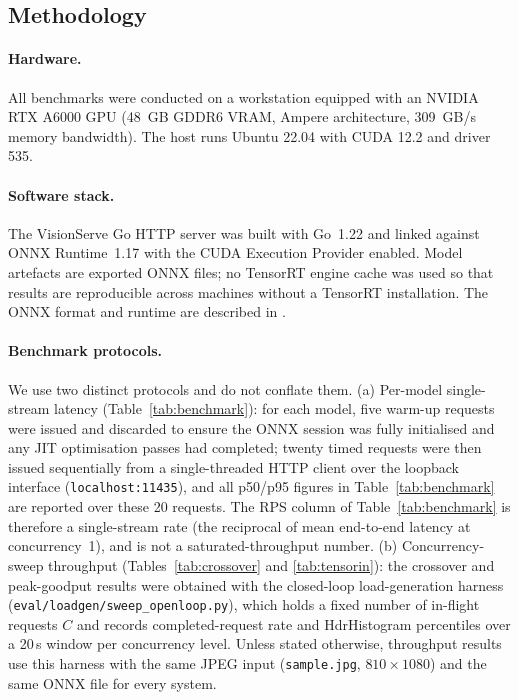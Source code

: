 
\subsection{Methodology}
\label{sec:eval:method}

\paragraph{Hardware.}
All benchmarks were conducted on a workstation equipped with an NVIDIA RTX A6000
GPU (48~GB GDDR6 VRAM, Ampere architecture, 309~GB/s memory bandwidth).
The host runs Ubuntu 22.04 with CUDA 12.2 and driver 535.

\paragraph{Software stack.}
The VisionServe Go HTTP server was built with Go~1.22 and linked against
ONNX Runtime~1.17 \cite{onnxruntime} with the CUDA Execution Provider enabled.
Model artefacts are exported ONNX files; no TensorRT engine cache was used so
that results are reproducible across machines without a TensorRT installation.
The ONNX format and runtime are described in \cite{onnx2019}.

\paragraph{Benchmark protocols.}
We use two distinct protocols and do not conflate
them.
(a) Per-model single-stream latency (Table~\ref{tab:benchmark}): for each
model, five warm-up requests were issued and discarded to ensure the ONNX session
was fully initialised and any JIT optimisation passes had completed; twenty timed
requests were then issued sequentially from a single-threaded HTTP client over
the loopback interface (\texttt{localhost:11435}), and all p50/p95 figures in
Table~\ref{tab:benchmark} are reported over these 20 requests.  The RPS column of
Table~\ref{tab:benchmark} is therefore a single-stream rate (the reciprocal of
mean end-to-end latency at concurrency~1), and is not a saturated-throughput
number.
(b) Concurrency-sweep throughput (Tables~\ref{tab:crossover} and
\ref{tab:tensorin}): the crossover and peak-goodput results were obtained with the
closed-loop load-generation harness (\texttt{eval/loadgen/sweep\_openloop.py}), which
holds a fixed number of in-flight requests $C$ and records completed-request rate and
HdrHistogram percentiles over a 20\,s window per concurrency level.  Unless stated
otherwise, throughput results use this harness with the same JPEG input
(\texttt{sample.jpg}, $810\times1080$) and the same ONNX file for every system.

